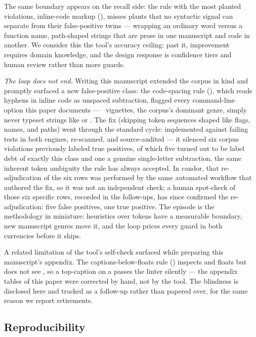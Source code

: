 \documentclass[nojss,article]{jss}
\newcommand{\rulelink}[1]{\hyperlink{rule:#1}{\code{#1}}}
\begin{document}
The same boundary appears on the recall side: the rule with the most
planted violations, inline-code markup
(\rulelink{JSS-MARKUP-003}), misses plants that no syntactic signal
can separate from their false-positive twins ---
 wrapping an ordinary word versus a
function name, path-shaped strings that are prose in one manuscript
and code in another. We consider this the tool's accuracy ceiling:
past it, improvement requires domain knowledge, and the design
response is confidence tiers and human review rather than more
guards.

\emph{The loop does not end.} Writing this manuscript extended the
corpus in kind and promptly surfaced a new false-positive class: the
code-spacing rule (\rulelink{JSS-CODE-003}), which reads hyphens in
inline code as unspaced subtraction, flagged every command-line
option this paper documents --- ~vignettes, the corpus's
dominant genre, simply never typeset strings like  or
. The fix (skipping token sequences
shaped like flags, names, and paths) went through the standard cycle:
implemented against failing tests in both engines, re-scanned, and
source-audited --- it silenced six corpus violations previously
labeled true positives, of which five turned out to be label debt of
exactly this class and one a genuine single-letter subtraction, the
same inherent token ambiguity the rule has always accepted. In candor,
that re-adjudication of the six rows was performed by the same
automated workflow that authored the fix, so it was not an independent
check; a human spot-check of those six specific rows, recorded in the
follow-ups, has since confirmed the re-adjudication: five false
positives, one true positive. The episode is the methodology in
miniature: heuristics over tokens have a measurable boundary, new
manuscript genres move it, and the loop prices every guard in both
currencies before it ships.

A related limitation of the tool's self-check surfaced while preparing
this manuscript's appendix. The captions-below-floats rule
(\rulelink{JSS-TYPO-004}) inspects  and 
floats but does not see , so a top-caption on a
 passes the linter silently --- the appendix tables of
this paper were corrected by hand, not by the tool. The blindness is
disclosed here and tracked as a follow-up rather than papered over,
for the same reason we report retirements.

\subsection{Reproducibility}
\label{sec:reproducibility}
\end{document}
